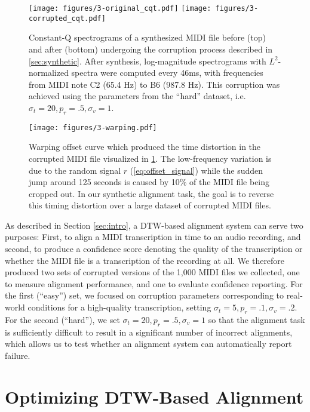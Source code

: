 \begin{figure}
  \centering
  \texttt{[image: figures/3-original\_cqt.pdf]}
  \texttt{[image: figures/3-corrupted\_cqt.pdf]}
  \caption[Constant-Q spectrograms of a MIDI file before and after corruption]{Constant-Q spectrograms of a synthesized MIDI file before (top) and after (bottom) undergoing the corruption process described in \cref{sec:synthetic}.
After synthesis, log-magnitude spectrograms with $L^2$-normalized spectra were computed every 46ms, with frequencies from MIDI note C2 (65.4 Hz) to B6 (987.8 Hz).
This corruption was achieved using the parameters from the ``hard'' dataset, i.e. $\sigma_t = 20, p_r = .5, \sigma_v = 1$.}
  \label{fig:corruption}
\end{figure}

\begin{figure}
  \centering
  \texttt{[image: figures/3-warping.pdf]}
  \caption[Example synthetic warping offset]{Warping offset curve which produced the time distortion in the corrupted MIDI file visualized in \cref{fig:corruption}.
The low-frequency variation is due to the random signal $r$ (\cref{eq:offset_signal}) while the sudden jump around 125 seconds is caused by 10\% of the MIDI file being cropped out.
In our synthetic alignment task, the goal is to reverse this timing distortion over a large dataset of corrupted MIDI files.}
  \label{fig:warping}
\end{figure}

As described in Section \ref{sec:intro}, a DTW-based alignment system can serve two purposes: First, to align a MIDI transcription in time to an audio recording, and second, to produce a confidence score denoting the quality of the transcription or whether the MIDI file is a transcription of the recording at all.
We therefore produced two sets of corrupted versions of the 1,000 MIDI files we collected, one to measure alignment performance, and one to evaluate confidence reporting.
For the first (``easy'') set, we focused on corruption parameters corresponding to real-world conditions for a high-quality transcription, setting $\sigma_t = 5, p_r = .1, \sigma_v = .2$.
For the second (``hard''), we set $\sigma_t = 20, p_r = .5, \sigma_v = 1$ so that the alignment task is sufficiently difficult to result in a significant number of incorrect alignments, which allows us to test whether an alignment system can automatically report failure.

\section{Optimizing DTW-Based Alignment}
\label{sec:optimizing}

